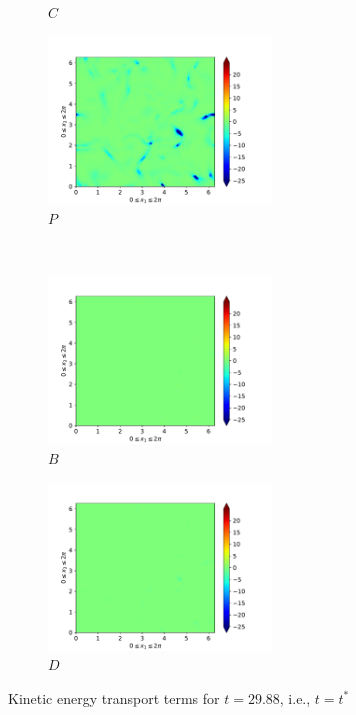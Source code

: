 \begin{figure}[H]
\begin{subfigure}{0.45\textwidth}
        \caption{$C$}
    \end{subfigure}
    \newline
    \begin{subfigure}{0.45\textwidth}
        \includegraphics[height=1.75in]{media/run-cds-65/P-ke-1340}
        \caption{$P$}
    \end{subfigure}
    ~
    \begin{subfigure}{0.45\textwidth}
        \includegraphics[height=1.75in]{media/run-cds-65/B-ke-1340}
        \caption{$B$}
    \end{subfigure}
    \newline
    \begin{subfigure}{0.45\textwidth}
        \includegraphics[height=1.75in]{media/run-cds-65/D-ke-1340}
        \caption{$D$}
    \end{subfigure}
    \caption{Kinetic energy transport terms for $t=29.88$, i.e., $t=t^{\ast} $}
\end{figure}

\newpage

